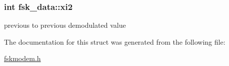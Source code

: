 \subsubsection[{xi2}]{\setlength{\rightskip}{0pt plus 5cm}int fsk\+\_\+data\+::xi2}\label{structfsk__data_a48bb683bd9e72b874c4050ae245fbc89}


previous to previous demodulated value 



The documentation for this struct was generated from the following file\+:\begin{DoxyCompactItemize}
\item 
\hyperlink{fskmodem_8h}{fskmodem.\+h}\end{DoxyCompactItemize}
